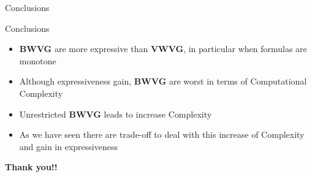 \documentclass{beamer}
\begin{document}
\begin{frame}[fragile]{Conclusions}
  \begin{block}{Conclusions}
    \begin{itemize}
      \item \textbf{BWVG} are more expressive than \textbf{VWVG}, in particular when formulas are monotone
      \item Although expressiveness gain, \textbf{BWVG} are worst in terms of Computational Complexity
      \item Unrestricted \textbf{BWVG} leads to increase Complexity
      \item As we have seen there are trade-off to deal with this increase of Complexity and gain in expressiveness
    \end{itemize}
  \end{block}
\end{frame}

\begin{frame}
  \begin{center}
    \textbf{\huge{Thank you!!}}
    \end{center}
\end{frame}
\end{document}
